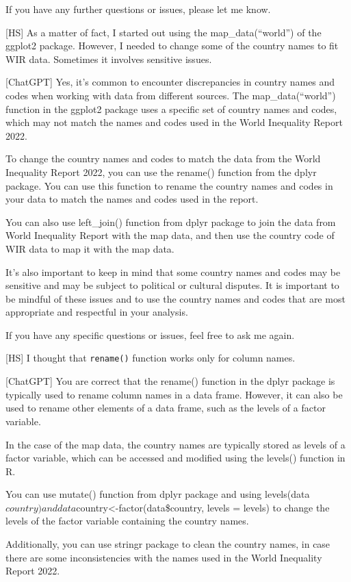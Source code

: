 \documentclass[
]{book}
\theoremstyle{definition}
\theoremstyle{definition}
\theoremstyle{definition}
\theoremstyle{definition}
\theoremstyle{remark}
\begin{document}
If you have any further questions or issues, please let me know.

{[}HS{]} As a matter of fact, I started out using the map\_data(``world'') of the ggplot2 package. However, I needed to change some of the country names to fit WIR data. Sometimes it involves sensitive issues.

{[}ChatGPT{]} Yes, it's common to encounter discrepancies in country names and codes when working with data from different sources. The map\_data(``world'') function in the ggplot2 package uses a specific set of country names and codes, which may not match the names and codes used in the World Inequality Report 2022.

To change the country names and codes to match the data from the World Inequality Report 2022, you can use the rename() function from the dplyr package. You can use this function to rename the country names and codes in your data to match the names and codes used in the report.

You can also use left\_join() function from dplyr package to join the data from World Inequality Report with the map data, and then use the country code of WIR data to map it with the map data.

It's also important to keep in mind that some country names and codes may be sensitive and may be subject to political or cultural disputes. It is important to be mindful of these issues and to use the country names and codes that are most appropriate and respectful in your analysis.

If you have any specific questions or issues, feel free to ask me again.

{[}HS{]} I thought that \texttt{rename()} function works only for column names.

{[}ChatGPT{]} You are correct that the rename() function in the dplyr package is typically used to rename column names in a data frame. However, it can also be used to rename other elements of a data frame, such as the levels of a factor variable.

In the case of the map data, the country names are typically stored as levels of a factor variable, which can be accessed and modified using the levels() function in R.

You can use mutate() function from dplyr package and using levels(data\(country) and data\)country\textless-factor(data\$country, levels = levels) to change the levels of the factor variable containing the country names.

Additionally, you can use stringr package to clean the country names, in case there are some inconsistencies with the names used in the World Inequality Report 2022.
\end{document}
